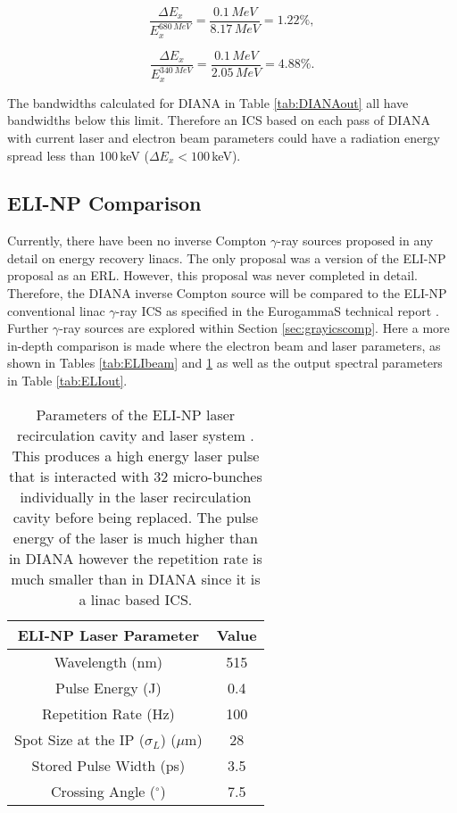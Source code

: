 \documentclass[11pt]{article}
\begin{document}
\begin{equation}
\frac{\Delta E_{x}}{E^{680\,MeV}_{x}} = \frac{0.1\,MeV}{8.17\,MeV} = 1.22\%,
\label{eq:680maxband}
\end{equation}

\begin{equation}
\frac{\Delta E_{x}}{E^{340\,MeV}_{x}} = \frac{0.1\,MeV}{2.05\,MeV} = 4.88\%.
\label{eq:340maxband}
\end{equation}

The bandwidths calculated for DIANA in Table \ref{tab:DIANAout} all have bandwidths below this limit. Therefore an ICS based on each pass of DIANA with current laser and electron beam parameters could have a radiation energy spread less than 100\,keV ($\Delta E_{x} < 100$\,keV). 
\subsection{ELI-NP Comparison}
\label{sec:ELIcomp}

Currently, there have been no inverse Compton $\gamma$-ray sources proposed in any detail on energy recovery linacs. The only proposal was a version of the ELI-NP \cite{ELINPwp} proposal as an ERL. However, this proposal was never completed in detail. Therefore, the DIANA inverse Compton source will be compared to the ELI-NP conventional linac $\gamma$-ray ICS as specified in the EurogammaS technical report \cite{EurogammaS}. Further $\gamma$-ray sources are explored within Section \ref{sec:grayicscomp}. Here a more in-depth comparison is made where the electron beam and laser parameters, as shown in Tables \ref{tab:ELIbeam} and \ref{tab:ELIlaser} as well as the output spectral parameters in Table \ref{tab:ELIout}.

\begin{table}[H]
\centering 
\begin{tabular}{|c||c|}
\hline
\textbf{ELI-NP Laser Parameter} & \textbf{Value} \\
\hline
Wavelength (nm) & 515 \\
\hline
Pulse Energy (J) & 0.4 \\
\hline
Repetition Rate (Hz) & 100 \\
\hline
Spot Size at the IP ($\sigma_{L}$) ($\mu$m) & 28 \\
\hline
Stored Pulse Width (ps) & 3.5 \\
\hline
Crossing Angle ($^{\circ}$) & 7.5 \\ 
\hline
\end{tabular}
\caption{\label{tab:ELIlaser} Parameters of the ELI-NP laser recirculation cavity and laser system \cite{EurogammaS}. This produces  a high energy laser pulse that is interacted with 32 micro-bunches individually in the laser recirculation cavity before being replaced. The pulse energy of the laser is much higher than in DIANA however the repetition rate is much smaller than in DIANA since it is a linac based ICS.}
\end{table}
\end{document}
